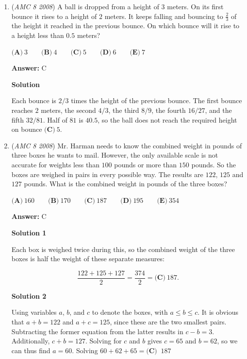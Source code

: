 \begin{enumerate}
	\item (\textit{AMC 8 2008}) A ball is dropped from a height of $3$ meters. On its first bounce it rises to a height of $2$ meters. It keeps falling and bouncing to $\frac{2}{3}$ of the height it reached in the previous bounce. On which bounce will it rise to a height less than $0.5$ meters?


 $\textbf{(A)}\  3 \qquad \textbf{(B)}\  4 \qquad \textbf{(C)}\ 5 \qquad \textbf{(D)}\ 6 \qquad \textbf{(E)}\ 7$

 \textbf{Answer: }C



\textbf{Solution}

Each bounce is $2/3$ times the height of the previous bounce. The first bounce reaches $2$ meters, the second $4/3$, the third $8/9$, the fourth $16/27$, and the fifth $32/81$. Half of $81$ is $40.5$, so the ball does not reach the required height on bounce $\boxed{\textbf{(C)}\ 5}$.

 


	\item (\textit{AMC 8 2008}) Mr. Harman needs to know the combined weight in pounds of three boxes he wants to mail. However, the only available scale is not accurate for weights less than $100$ pounds or more than $150$ pounds. So the boxes are weighed in pairs in every possible way. The results are $122$, $125$ and $127$ pounds. What is the combined weight in pounds of the three boxes?


 $\textbf{(A)}\ 160\qquad \textbf{(B)}\ 170\qquad \textbf{(C)}\ 187\qquad \textbf{(D)}\ 195\qquad \textbf{(E)}\ 354$

 \textbf{Answer: }C



\textbf{Solution 1}

Each box is weighed twice during this, so the combined weight of the three boxes is half the weight of these separate measures:

 
 \[\frac{122+125+127}{2} = \frac{374}{2} = \boxed{\textbf{(C)}\ 187}.\]




\textbf{Solution 2}

Using variables $a$, $b$, and $c$ to denote the boxes, with $a \le b \le c$. It is obvious that $a+b=122$ and $a+c=125$, since these are the two smallest pairs. Subtracting the former equation from the latter results in $c-b=3$. Additionally, $c+b=127$. Solving for $c$ and $b$ gives $c=65$ and $b=62$, so we can thus find $a=60$. Solving $60+62+65=\boxed{\textbf{(C) }\ 187}$





\end{enumerate}
